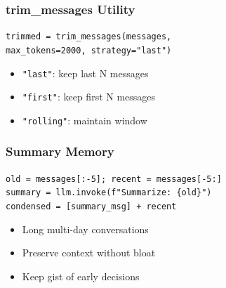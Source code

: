 \documentclass[aspectratio=169,11pt]{beamer}
\begin{document}
\begin{frame}
\frametitle{trim\_messages Utility}
\begin{tipbox}
\texttt{trimmed = trim\_messages(messages,}\\
\texttt{max\_tokens=2000, strategy="last")}
\end{tipbox}
\vspace{0.1cm}
\begin{tipbox}[Strategies]
\setlength{\itemsep}{1pt}
\begin{itemize}
\item \texttt{"last"}: keep last N messages
\item \texttt{"first"}: keep first N messages
\item \texttt{"rolling"}: maintain window
\end{itemize}
\end{tipbox}
\end{frame}

\begin{frame}
\frametitle{Summary Memory}
\begin{tipbox}
\texttt{old = messages[:-5]; recent = messages[-5:]}\\
\texttt{summary = llm.invoke(f"Summarize: \{old\}")}\\
\texttt{condensed = [summary\_msg] + recent}
\end{tipbox}
\vspace{0.1cm}
\begin{tipbox}
\setlength{\itemsep}{1pt}
\begin{itemize}
\item Long multi-day conversations
\item Preserve context without bloat
\item Keep gist of early decisions
\end{itemize}
\end{tipbox}
\end{frame}
\end{document}
